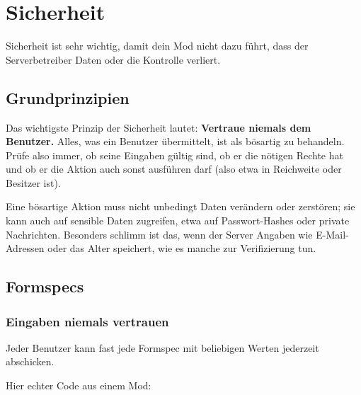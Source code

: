 \chapter{Sicherheit}
\label{ch:quality/security}

Sicherheit ist sehr wichtig, damit dein Mod nicht dazu führt, dass der
Serverbetreiber Daten oder die Kontrolle verliert.

\section{Grundprinzipien}\label{grundprinzipien}

Das wichtigste Prinzip der Sicherheit lautet: \textbf{Vertraue niemals
dem Benutzer.} Alles, was ein Benutzer übermittelt, ist als bösartig zu
behandeln. Prüfe also immer, ob seine Eingaben gültig sind, ob er die
nötigen Rechte hat und ob er die Aktion auch sonst ausführen darf (also
etwa in Reichweite oder Besitzer ist).

Eine bösartige Aktion muss nicht unbedingt Daten verändern oder
zerstören; sie kann auch auf sensible Daten zugreifen, etwa auf
Passwort-Hashes oder private Nachrichten. Besonders schlimm ist das,
wenn der Server Angaben wie E-Mail-Adressen oder das Alter speichert,
wie es manche zur Verifizierung tun.

\section{Formspecs}\label{formspecs}

\subsection{Eingaben niemals
vertrauen}\label{eingaben-niemals-vertrauen}

Jeder Benutzer kann fast jede Formspec mit
beliebigen Werten jederzeit abschicken.

Hier echter Code aus einem Mod:

